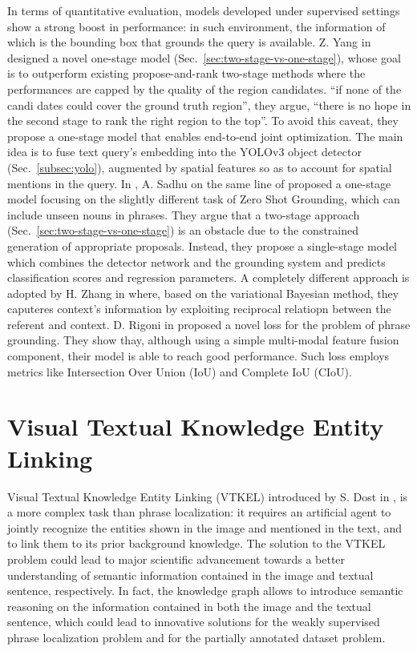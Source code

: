 In terms of quantitative evaluation, models developed under supervised
settings show a strong boost in performance: in such environment, the
information of which is the bounding box that grounds the query is
available. Z. Yang \etal{} in \cite{yang2019fast} designed a novel
one-stage model (Sec.~\ref{sec:two-stage-vs-one-stage}), whose goal is
to outperform existing propose-and-rank two-stage methods where the
performances are capped by the quality of the region candidates. ``if
none of the candi dates could cover the ground truth region'', they
argue, ``there is no hope in the second stage to rank the right region
to the top''. To avoid this caveat, they propose a one-stage model
that enables end-to-end joint optimization. The main idea is to fuse
text query's embedding into the YOLOv3 object detector
(Sec.~\ref{subsec:yolo}), augmented by spatial features so as to
account for spatial mentions in the query. In \cite{sadhu2019zero}, A.
Sadhu \etal{} on the same line of \cite{yang2019fast} proposed a
one-stage model focusing on the slightly different task of Zero Shot
Grounding, which can include unseen nouns in phrases. They argue that
a two-stage approach (Sec.~\ref{sec:two-stage-vs-one-stage}) is an
obstacle due to the constrained generation of appropriate proposals.
Instead, they propose a single-stage model which combines the detector
network and the grounding system and predicts classification scores
and regression parameters. A completely different approach is adopted
by H. Zhang \etal{} in \cite{zhang2018grounding} where, based on the
variational Bayesian method, they caputeres context's information by
exploiting reciprocal relatiopn between the referent and context. D.
Rigoni \etal{} in \cite{rigoni2021better} proposed a novel loss for
the problem of phrase grounding. They show thay, although using a
simple multi-modal feature fusion component, their model is able to
reach good performance. Such loss employs metrics like Intersection
Over Union (IoU) and Complete IoU (CIoU).

\section{Visual Textual Knowledge Entity Linking}

Visual Textual Knowledge Entity Linking (VTKEL) introduced by S. Dost
\etal{} in \cite{dost2020jointly, dost2020vtkel, dost2020visual}, is a
more complex task than phrase localization: it requires an artificial
agent to jointly recognize the entities shown in the image and
mentioned in the text, and to link them to its prior background
knowledge. The solution to the VTKEL problem could lead to major
scientific advancement towards a better understanding of semantic
information contained in the image and textual sentence, respectively.
In fact, the knowledge graph allows to introduce semantic reasoning on
the information contained in both the image and the textual sentence,
which could lead to innovative solutions for the weakly supervised
phrase localization problem and for the partially annotated dataset
problem.

